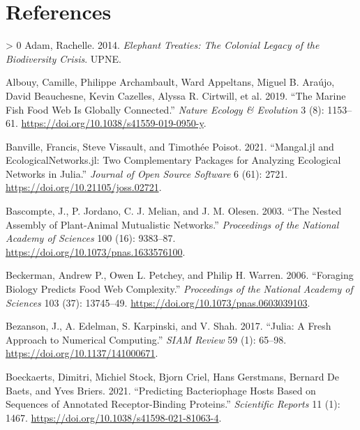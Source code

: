 \documentclass[11pt]{article}
\newlength{\cslhangindent}
\newenvironment{CSLReferences}[3] %
 {%
  \setlength{\parindent}{0pt}
  \ifodd #1 \everypar{\setlength{\hangindent}{\cslhangindent}}\ignorespaces\fi
  \ifnum #2 > 0
  \setlength{\parskip}{#2\baselineskip}
  \fi
 }%
 {}
\begin{document}
\hypertarget{references}{%
\section*{References}\label{references}}

\hypertarget{refs}{}
\begin{CSLReferences}{1}{0}
\leavevmode\hypertarget{ref-Adam2014EleTre}{}%
Adam, Rachelle. 2014. \emph{Elephant Treaties: The Colonial Legacy of
the Biodiversity Crisis}. UPNE.

\leavevmode\hypertarget{ref-Albouy2019MarFis}{}%
Albouy, Camille, Philippe Archambault, Ward Appeltans, Miguel B. Araújo,
David Beauchesne, Kevin Cazelles, Alyssa R. Cirtwill, et al. 2019.
{``The Marine Fish Food Web Is Globally Connected.''} \emph{Nature
Ecology \& Evolution} 3 (8): 1153--61.
\url{https://doi.org/10.1038/s41559-019-0950-y}.

\leavevmode\hypertarget{ref-Banville2021ManJl}{}%
Banville, Francis, Steve Vissault, and Timothée Poisot. 2021.
{``Mangal.jl and EcologicalNetworks.jl: Two Complementary Packages for
Analyzing Ecological Networks in Julia.''} \emph{Journal of Open Source
Software} 6 (61): 2721. \url{https://doi.org/10.21105/joss.02721}.

\leavevmode\hypertarget{ref-Bascompte2003NesAss}{}%
Bascompte, J., P. Jordano, C. J. Melian, and J. M. Olesen. 2003. {``The
Nested Assembly of Plant-Animal Mutualistic Networks.''}
\emph{Proceedings of the National Academy of Sciences} 100 (16):
9383--87. \url{https://doi.org/10.1073/pnas.1633576100}.

\leavevmode\hypertarget{ref-Beckerman2006ForBio}{}%
Beckerman, Andrew P., Owen L. Petchey, and Philip H. Warren. 2006.
{``Foraging Biology Predicts Food Web Complexity.''} \emph{Proceedings
of the National Academy of Sciences} 103 (37): 13745--49.
\url{https://doi.org/10.1073/pnas.0603039103}.

\leavevmode\hypertarget{ref-Bezanson2017JulFre}{}%
Bezanson, J., A. Edelman, S. Karpinski, and V. Shah. 2017. {``Julia: A
Fresh Approach to Numerical Computing.''} \emph{SIAM Review} 59 (1):
65--98. \url{https://doi.org/10.1137/141000671}.

\leavevmode\hypertarget{ref-Boeckaerts2021PreBac}{}%
Boeckaerts, Dimitri, Michiel Stock, Bjorn Criel, Hans Gerstmans, Bernard
De Baets, and Yves Briers. 2021. {``Predicting Bacteriophage Hosts Based
on Sequences of Annotated Receptor-Binding Proteins.''} \emph{Scientific
Reports} 11 (1): 1467. \url{https://doi.org/10.1038/s41598-021-81063-4}.


\end{CSLReferences}
\end{document}
